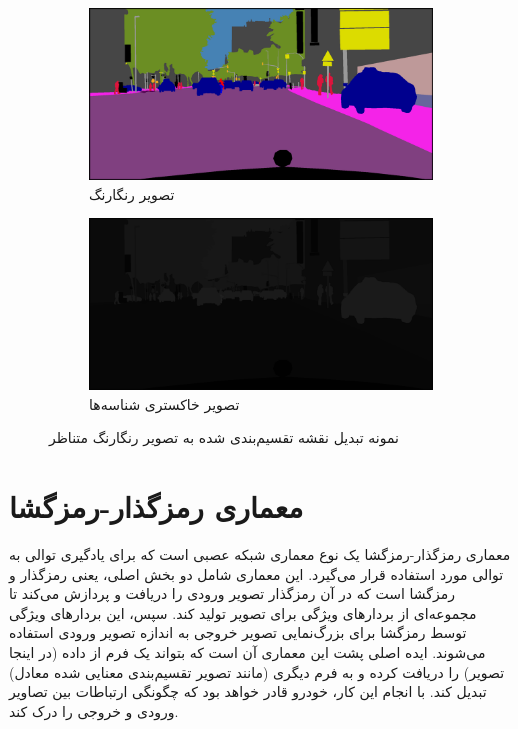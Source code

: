 \begin{figure}[ht]
	\begin{subfigure}{0.45\textwidth}
		\includegraphics[width=\linewidth, height=0.2\textheight]{Images/Chapter3/aachen_000005_000019_gtFine_color.png}
		\caption{تصویر رنگارنگ}
		\label{f64}
	\end{subfigure}\hfil
	\begin{subfigure}{0.45\textwidth}
		\includegraphics[width=\linewidth, height=0.2\textheight]{Images/Chapter3/aachen_000005_000019_gtFine_labelIds.png}
		\caption{تصویر خاکستری شناسه‌ها}
		\label{f65}
	\end{subfigure}
	\centering
	\caption{نمونه تبدیل نقشه تقسیم‌بندی شده به تصویر رنگارنگ متناظر}
	\label{fig:fig3}
\end{figure}

\section{معماری رمزگذار-رمزگشا}

معماری رمزگذار-رمزگشا
یک نوع معماری شبکه عصبی است که برای یادگیری توالی به توالی
\cite{sutskever2014sequence}
مورد استفاده قرار می‌گیرد. این معماری شامل دو بخش اصلی، یعنی رمزگذار
و رمزگشا
است که در آن رمزگذار تصویر ورودی را دریافت و پردازش می‌کند تا مجموعه‌ای از بردار‌های ویژگی‌
برای تصویر تولید کند. سپس، این بردار‌های ویژگی‌ توسط رمزگشا برای بزرگ‌نمایی تصویر خروجی به اندازه تصویر ورودی استفاده می‌شوند. ایده اصلی پشت این معماری آن است که بتواند یک فرم از داده (در اینجا تصویر) را دریافت کرده و به فرم دیگری (مانند تصویر تقسیم‌بندی معنایی شده معادل) تبدیل کند. با انجام این کار، خودرو قادر خواهد بود که چگونگی ارتباطات بین تصاویر ورودی و خروجی را درک کند.

